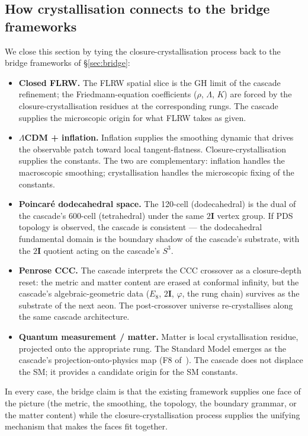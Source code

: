 \documentclass[11pt]{article}
\theoremstyle{plain}
\theoremstyle{definition}
\theoremstyle{remark}
\newcommand{\twoI}{2\mathbf{I}}
\begin{document}
\subsection{How crystallisation connects to the bridge frameworks}\label{sec:cry-bridges}

We close this section by tying the closure-crystallisation process back to the bridge frameworks of \S\ref{sec:bridge}:

\begin{itemize}[leftmargin=2em]
\item \textbf{Closed FLRW.} The FLRW spatial slice is the GH limit of the cascade refinement; the Friedmann-equation coefficients ($\rho$, $\Lambda$, $K$) are forced by the closure-crystallisation residues at the corresponding rungs. The cascade supplies the microscopic origin for what FLRW takes as given.
\item \textbf{$\Lambda$CDM + inflation.} Inflation supplies the smoothing dynamic that drives the observable patch toward local tangent-flatness. Closure-crystallisation supplies the constants. The two are complementary: inflation handles the macroscopic smoothing; crystallisation handles the microscopic fixing of the constants.
\item \textbf{Poincar\'e dodecahedral space.} The 120-cell (dodecahedral) is the dual of the cascade's 600-cell (tetrahedral) under the same $\twoI$ vertex group. If PDS topology is observed, the cascade is consistent --- the dodecahedral fundamental domain is the boundary shadow of the cascade's substrate, with the $\twoI$ quotient acting on the cascade's $S^3$.
\item \textbf{Penrose CCC.} The cascade interprets the CCC crossover as a closure-depth reset: the metric and matter content are erased at conformal infinity, but the cascade's algebraic-geometric data ($E_8$, $\twoI$, $\varphi$, the rung chain) survives as the substrate of the next aeon. The post-crossover universe re-crystallises along the same cascade architecture.
\item \textbf{Quantum measurement / matter.} Matter is local crystallisation residue, projected onto the appropriate rung. The Standard Model emerges as the cascade's projection-onto-physics map (F8 of~\citealp{SmartXXXVI}). The cascade does not displace the SM; it provides a candidate origin for the SM constants.
\end{itemize}

In every case, the bridge claim is that the existing framework supplies one face of the picture (the metric, the smoothing, the topology, the boundary grammar, or the matter content) while the closure-crystallisation process supplies the unifying mechanism that makes the faces fit together.
\end{document}
